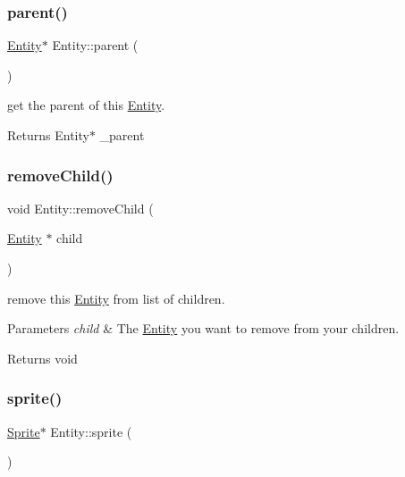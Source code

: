 \subsubsection{\texorpdfstring{parent()}{parent()}}
{\footnotesize\ttfamily \hyperlink{class_entity}{Entity}$\ast$ Entity\+::parent (\begin{DoxyParamCaption}{ }\end{DoxyParamCaption})\hspace{0.3cm}{\ttfamily [inline]}}



get the parent of this \hyperlink{class_entity}{Entity}. 

\begin{DoxyReturn}{Returns}
Entity$\ast$ \+\_\+parent 
\end{DoxyReturn}
\mbox{\label{class_entity_a45d5a3b92478ad8b4fb305b9b3e08c7a}} 
\subsubsection{\texorpdfstring{remove\+Child()}{removeChild()}}
{\footnotesize\ttfamily void Entity\+::remove\+Child (\begin{DoxyParamCaption}\item[{\hyperlink{class_entity}{Entity} $\ast$}]{child }\end{DoxyParamCaption})}



remove this \hyperlink{class_entity}{Entity} from list of children. 


\begin{DoxyParams}{Parameters}
{\em child} & The \hyperlink{class_entity}{Entity} you want to remove from your children. \\
\hline
\end{DoxyParams}
\begin{DoxyReturn}{Returns}
void 
\end{DoxyReturn}
\mbox{\label{class_entity_a766b6c5da328efaa419bebe4f67479b9}} 
\subsubsection{\texorpdfstring{sprite()}{sprite()}}
{\footnotesize\ttfamily \hyperlink{class_sprite}{Sprite}$\ast$ Entity\+::sprite (\begin{DoxyParamCaption}{ }\end{DoxyParamCaption})\hspace{0.3cm}{\ttfamily [inline]}}



